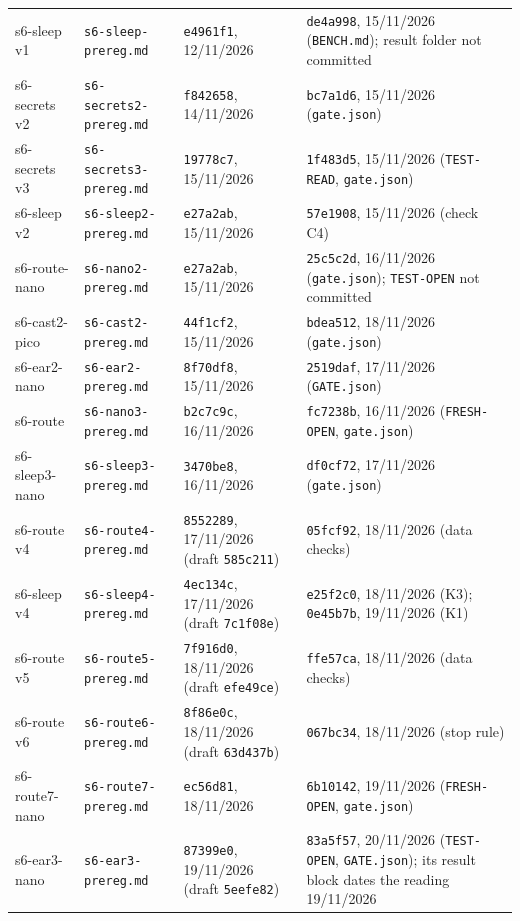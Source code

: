 \documentclass[10pt]{article}
\begin{document}
\begin{table}[p]
\begin{tabularx}{\linewidth}{@{}P{2.35cm}P{3.55cm}LL@{}}
s6-sleep v1 & \texttt{s6-sleep-prereg.md} & \texttt{e4961f1}, 12/11/2026 & \texttt{de4a998}, 15/11/2026 (\texttt{BENCH.md}); result folder not committed \\
s6-secrets v2 & \texttt{s6-secrets2-prereg.md} & \texttt{f842658}, 14/11/2026 & \texttt{bc7a1d6}, 15/11/2026 (\texttt{gate.json}) \\
s6-secrets v3 & \texttt{s6-secrets3-prereg.md} & \texttt{19778c7}, 15/11/2026 & \texttt{1f483d5}, 15/11/2026 (\texttt{TEST-READ}, \texttt{gate.json}) \\
s6-sleep v2 & \texttt{s6-sleep2-prereg.md} & \texttt{e27a2ab}, 15/11/2026 & \texttt{57e1908}, 15/11/2026 (check C4) \\
s6-route-nano & \texttt{s6-nano2-prereg.md} & \texttt{e27a2ab}, 15/11/2026 & \texttt{25c5c2d}, 16/11/2026 (\texttt{gate.json}); \texttt{TEST-OPEN} not committed \\
s6-cast2-pico & \texttt{s6-cast2-prereg.md} & \texttt{44f1cf2}, 15/11/2026 & \texttt{bdea512}, 18/11/2026 (\texttt{gate.json}) \\
s6-ear2-nano & \texttt{s6-ear2-prereg.md} & \texttt{8f70df8}, 15/11/2026 & \texttt{2519daf}, 17/11/2026 (\texttt{GATE.json}) \\
s6-route & \texttt{s6-nano3-prereg.md} & \texttt{b2c7c9c}, 16/11/2026 & \texttt{fc7238b}, 16/11/2026 (\texttt{FRESH-OPEN}, \texttt{gate.json}) \\
s6-sleep3-nano & \texttt{s6-sleep3-prereg.md} & \texttt{3470be8}, 16/11/2026 & \texttt{df0cf72}, 17/11/2026 (\texttt{gate.json}) \\
s6-route v4 & \texttt{s6-route4-prereg.md} & \texttt{8552289}, 17/11/2026 (draft \texttt{585c211}) & \texttt{05fcf92}, 18/11/2026 (data checks) \\
s6-sleep v4 & \texttt{s6-sleep4-prereg.md} & \texttt{4ec134c}, 17/11/2026 (draft \texttt{7c1f08e}) & \texttt{e25f2c0}, 18/11/2026 (K3); \texttt{0e45b7b}, 19/11/2026 (K1) \\
s6-route v5 & \texttt{s6-route5-prereg.md} & \texttt{7f916d0}, 18/11/2026 (draft \texttt{efe49ce}) & \texttt{ffe57ca}, 18/11/2026 (data checks) \\
s6-route v6 & \texttt{s6-route6-prereg.md} & \texttt{8f86e0c}, 18/11/2026 (draft \texttt{63d437b}) & \texttt{067bc34}, 18/11/2026 (stop rule) \\
s6-route7-nano & \texttt{s6-route7-prereg.md} & \texttt{ec56d81}, 18/11/2026 & \texttt{6b10142}, 19/11/2026 (\texttt{FRESH-OPEN}, \texttt{gate.json}) \\
s6-ear3-nano & \texttt{s6-ear3-prereg.md} & \texttt{87399e0}, 19/11/2026 (draft \texttt{5eefe82}) & \texttt{83a5f57}, 20/11/2026 (\texttt{TEST-OPEN}, \texttt{GATE.json}); its result block dates the reading 19/11/2026 \\

\end{tabularx}
\end{table}
\end{document}
